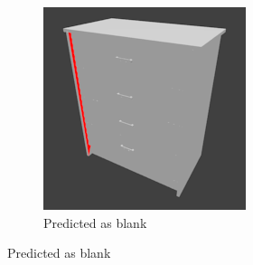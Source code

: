 \begin{figure}
	\begin{subfigure}{.3\textwidth}
		\centering
		\includegraphics[width=.8\textwidth]{images/dresser_0215_2_010.png}
		\caption{Predicted as blank}
		\label{fig:small-features-c}
	\end{subfigure}
	

\end{figure}
